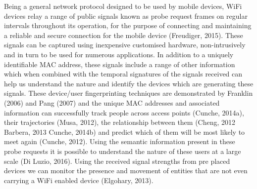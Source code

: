 Being a general network protocol designed to be used by mobile devices, WiFi devices relay a range of public signals known as probe request frames on regular intervals throughout its operation, for the purpose of connecting and maintaining a reliable and secure connection for the mobile device (Freudiger, 2015).
These signals can be captured using inexpensive customised hardware, non-intrusively and in turn to be used for numerous applications.
In addition to a uniquely identifiable MAC address, these signals include a range of other information which when combined with the temporal signatures of the signals received can help us understand the nature and identify the devices which are generating these signals.
These device/user fingerprinting techniques are demonstrated by Franklin (2006) and Pang (2007) and the unique MAC addresses and associated information can successfully track people across access points (Cunche, 2014a), their trajectories (Musa, 2012), the relationship between them (Cheng, 2012 Barbera, 2013 Cunche, 2014b) and predict which of them will be most likely to meet again (Cunche, 2012).
Using the semantic information present in these probe requests it is possible to understand the nature of these users at a large scale (Di Luzio, 2016).
Using the received signal strengths from pre placed devices we can monitor the presence and movement of entities that are not even carrying a WiFi enabled device (Elgohary, 2013).

